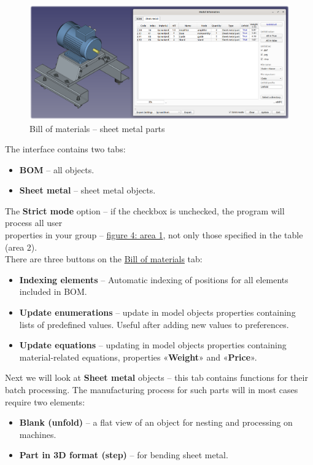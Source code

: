 \documentclass[a4paper,12pt]{article}
\begin{document}
\begin{figure}[htp]
	\centering
	\includegraphics[width=1\textwidth]{img/info_sm.png}
	\caption{Bill of materials -- sheet metal parts}
	\label{sec:info_sm}
\end{figure}

The interface contains two tabs:
\begin{itemize}
	\item \textbf{BOM} -- all objects.
	\item \textbf{Sheet metal} -- sheet metal objects.\\
\end{itemize}

\pagebreak

The \textbf{Strict mode} option -- if the checkbox is unchecked, the program will process all user\\ properties in your group -- \hyperref[sec:pref_uProp]{figure 4: area 1}, not only those specified in the table (area 2).\\

There are three buttons on the \hyperref[sec:info_sm]{Bill of materials} tab:
\begin{itemize}
	\item \textbf{Indexing elements} -- Automatic indexing of positions for all elements\\included in BOM.
	\item \textbf{Update enumerations} -- update in model objects properties containing\\lists of predefined values. Useful after adding new values ​​to preferences.
	\item \textbf{Update equations} -- updating in model objects properties containing material-related equations, properties «\textbf{Weight}» and «\textbf{Price}».\\
\end{itemize}

Next we will look at \textbf{Sheet metal} objects -- this tab contains functions for their batch processing. The manufacturing process for such parts will in most cases require two elements:
\begin{itemize}
	\item \textbf{Blank (unfold)} -- a flat view of an object for nesting and processing on machines.
	\item \textbf{Part in 3D format (step)} -- for bending sheet metal.\\
\end{itemize}
\end{document}
